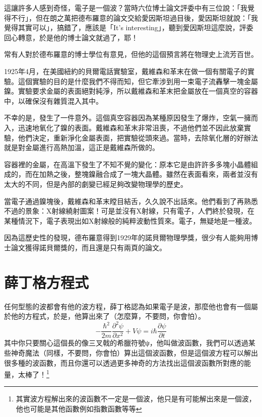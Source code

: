 這讓許多人感到奇怪，電子是一個波？當時六位博士論文評委中有三位說：「我覺得不行」，但在朗之萬把德布羅意的論文交給愛因斯坦過目後，愛因斯坦就說：「我覺得其實可以」，搞錯了，應該是「It’s interesting」，聽到愛因斯坦這麼說，評委回心轉意，於是他的博士論文就過了，耶！

常有人對於德布羅意的博士學位有意見，但他的這個預言將在物理史上流芳百世。

\begin{tcolorbox}[breakable, title={德布羅伊的博士論文和他的諾貝爾獎，出自《量子物理史話》}, before upper={\parindent2em}, parbox=false]

1925年4月，在美國紐約的貝爾電話實驗室，戴維森和革末在做一個有關電子的實驗。這個實驗的目的是什麼我們不得而知，但它牽涉到用一束電子流轟擊一塊金屬鎳。實驗要求金屬的表面絕對純淨，所以戴維森和革末把金屬放在一個真空的容器中，以確保沒有雜質混入其中。

不幸的是，發生了一件意外。這個真空容器因為某種原因發生了爆炸，空氣一擁而入，迅速地氧化了鎳的表面。戴維森和革末非常沮喪，不過他們並不因此放棄實驗，他們決定，重新淨化金屬表面，把實驗從頭來過。當時，去除氧化層的好辦法就是對金屬進行高熱加溫，這正是戴維森所做的。

容器裡的金屬，在高溫下發生了不知不覺的變化：原本它是由許許多多塊小晶體組成的，而在加熱之後，整塊鎳融合成了一塊大晶體。雖然在表面看來，兩者並沒有太大的不同，但是內部的劇變已經足夠改變物理學的歷史。

當電子通過鎳塊後，戴維森和革末瞠目結舌，久久說不出話來。他們看到了再熟悉不過的景象：X射線繞射圖案！可是並沒有X射線，只有電子，人們終於發現，在某種情況下，電子表現出如X射線般的純粹波動性質來。電子，無疑地是一種波。

因為這歷史性的發現，德布羅意得到1929年的諾貝爾物理學獎，很少有人能夠用博士論文獲得諾貝爾獎的，而且還是只有兩頁的論文。
\end{tcolorbox}

\section{薛丁格方程式}
任何型態的波都會有他的波方程，薛丁格認為如果電子是波，那麼他也會有一個屬於他的方程式，於是，他算出來了（怎麼算，不要問，你會怕）。
$$
-\frac{\hbar^{2}}{2 m} \frac{\partial^{2} \psi}{\partial x^{2}}+V \psi=i \hbar \frac{\partial \psi}{\partial t}
$$
其中你只要關心這個長的像三叉戟的希臘符號ψ，他叫做波函數，我們可以透過某些神奇魔法（同樣，不要問，你會怕）算出這個波函數，但是這個波方程可以解出很多種的波函數，而且你還可以透過更多神奇的方法找出這個波函數所對應的能量，太棒了！\footnote{其實波方程解出來的波函數不一定是一個波，他只是有可能解出來是一個波，他也可能是其他函數例如指數函數等等}

